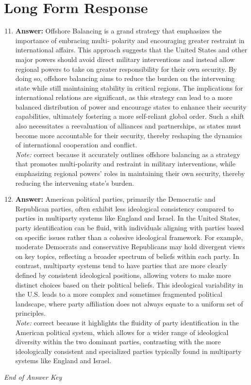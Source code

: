 \documentclass[12pt]{article}
\begin{document}
\section*{Long Form Response}
\begin{enumerate}[label=\arabic*.]
\setcounter{enumi}{10}
\item \textbf{Answer:} Offshore Balancing is a grand strategy that emphasizes the importance of embracing multi- polarity and encouraging greater restraint in international affairs. This approach suggests that the United States and other major powers should avoid direct military interventions and instead allow regional powers to take on greater responsibility for their own security. By doing so, offshore balancing aims to reduce the burden on the intervening state while still maintaining stability in critical regions. The implications for international relations are significant, as this strategy can lead to a more balanced distribution of power and encourage states to enhance their security capabilities, ultimately fostering a more self-reliant global order. Such a shift also necessitates a reevaluation of alliances and partnerships, as states must become more accountable for their security, thereby reshaping the dynamics of international cooperation and conflict.
\\ \textit{Note:} correct because it accurately outlines offshore balancing as a strategy that promotes multi-polarity and restraint in military interventions, while emphasizing regional powers' roles in maintaining their own security, thereby reducing the intervening state's burden.
\item \textbf{Answer:} American political parties, primarily the Democratic and Republican parties, often exhibit less ideological consistency compared to parties in multiparty systems like England and Israel. In the United States, party identification can be fluid, with individuals aligning with parties based on specific issues rather than a cohesive ideological framework. For example, moderate Democrats and conservative Republicans may hold divergent views on key topics, reflecting a broader spectrum of beliefs within each party. In contrast, multiparty systems tend to have parties that are more clearly defined by consistent ideological positions, allowing voters to make more distinct choices based on their political beliefs. This ideological variability in the U.S. leads to a more complex and sometimes fragmented political landscape, where party affiliation does not always equate to a uniform set of principles.
\\ \textit{Note:} correct because it highlights the fluidity of party identification in the American political system, which allows for a wider range of ideological diversity within the two dominant parties, contrasting with the more ideologically consistent and specialized parties typically found in multiparty systems like England and Israel.
\end{enumerate}

\vfill
\noindent\textit{End of Answer Key}
\end{document}
